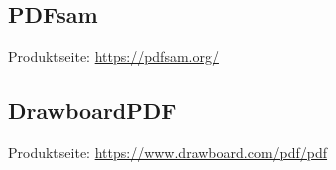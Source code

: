 
\subsection{PDFsam}
Produktseite: \url{https://pdfsam.org/}

\subsection{DrawboardPDF}
Produktseite: \url{https://www.drawboard.com/pdf/pdf}

